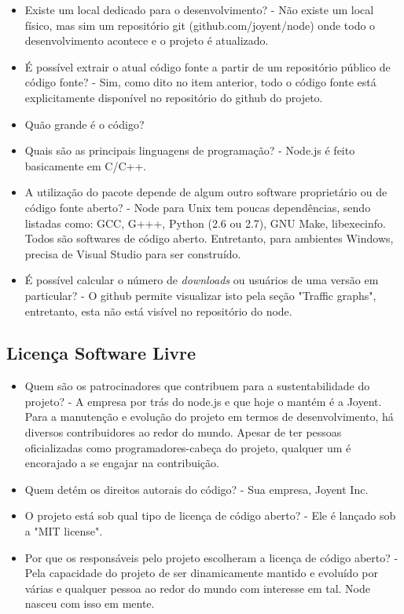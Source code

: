 \documentclass[12pt,a4paper]{article} %
\begin{document}
\begin{itemize}
\item Existe um local dedicado para o desenvolvimento? - Não existe um local físico, mas sim um repositório git (github.com/joyent/node) onde todo o desenvolvimento acontece e o projeto é atualizado.
\item É possível extrair o atual código fonte a partir de um repositório público de código fonte? - Sim, como dito no item anterior, todo o código fonte está explicitamente disponível no repositório do github do projeto.
\item Quão grande é o código?
\item Quais são as principais linguagens de programação? - Node.js é feito basicamente em C/C++.
\item A utilização do pacote depende de algum outro software proprietário ou de código fonte aberto? - Node para Unix tem poucas dependências, sendo listadas como: GCC, G+++, Python (2.6 ou 2.7), GNU Make, libexecinfo. Todos são softwares de código aberto. Entretanto, para ambientes Windows, precisa de Visual Studio para ser construído.
\item É possível calcular o número de \textit{downloads} ou usuários de uma versão em particular? - O github permite visualizar isto pela seção "Traffic graphs", entretanto, esta não está visível no repositório do node.
\end{itemize}

\subsection{Licença Software Livre}


\begin{itemize}
\item Quem são os patrocinadores que contribuem para a sustentabilidade do projeto? - A empresa por trás do node.js e que hoje o mantém é a Joyent. Para a manutenção e evolução do projeto em termos de desenvolvimento, há diversos contribuidores ao redor do mundo. Apesar de ter pessoas oficializadas como programadores-cabeça do projeto, qualquer um é encorajado a se engajar na contribuição.
\item Quem detém os direitos autorais do código? - Sua empresa, Joyent Inc.
\item O projeto está sob qual tipo de licença de código aberto? - Ele é lançado sob a "MIT license".
\item Por que os responsáveis pelo projeto escolheram a licença de código aberto? - Pela capacidade do projeto de ser dinamicamente mantido e evoluído por várias e qualquer pessoa ao redor do mundo com interesse em tal. Node nasceu com isso em mente.
\end{itemize}
\end{document}
